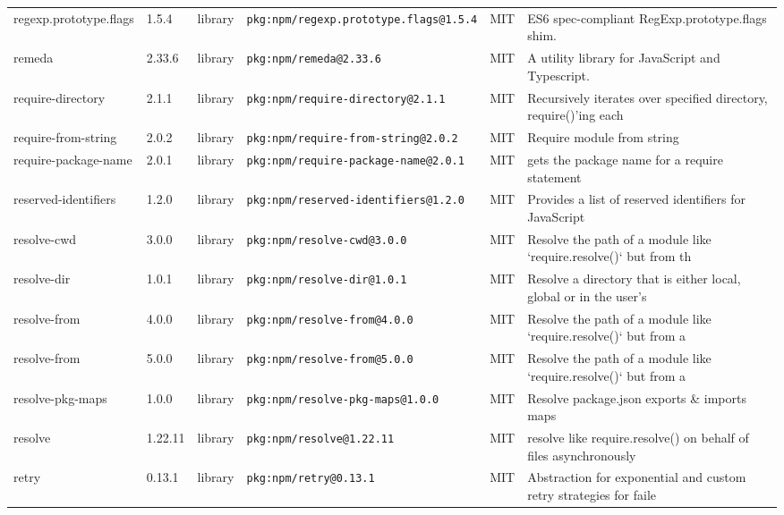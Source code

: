 \documentclass[11pt,a4paper]{article}
\begin{document}
\begin{longtable}{|p{4cm}|p{2cm}|p{1.6cm}|p{5cm}|p{1.5cm}|p{3.5cm}|}
\raggedright regexp.prototype.flags & 1.5.4 & library & \small\texttt{pkg:npm/regexp.prototype.flags@1.5.4} & MIT & \small ES6 spec-compliant RegExp.prototype.flags shim. \\
\raggedright remeda & 2.33.6 & library & \small\texttt{pkg:npm/remeda@2.33.6} & MIT & \small A utility library for JavaScript and Typescript. \\
\raggedright require-directory & 2.1.1 & library & \small\texttt{pkg:npm/require-directory@2.1.1} & MIT & \small Recursively iterates over specified directory, require()'ing each \\
\raggedright require-from-string & 2.0.2 & library & \small\texttt{pkg:npm/require-from-string@2.0.2} & MIT & \small Require module from string \\
\raggedright require-package-name & 2.0.1 & library & \small\texttt{pkg:npm/require-package-name@2.0.1} & MIT & \small gets the package name for a require statement \\
\raggedright reserved-identifiers & 1.2.0 & library & \small\texttt{pkg:npm/reserved-identifiers@1.2.0} & MIT & \small Provides a list of reserved identifiers for JavaScript \\
\raggedright resolve-cwd & 3.0.0 & library & \small\texttt{pkg:npm/resolve-cwd@3.0.0} & MIT & \small Resolve the path of a module like `require.resolve()` but from th \\
\raggedright resolve-dir & 1.0.1 & library & \small\texttt{pkg:npm/resolve-dir@1.0.1} & MIT & \small Resolve a directory that is either local, global or in the user's \\
\raggedright resolve-from & 4.0.0 & library & \small\texttt{pkg:npm/resolve-from@4.0.0} & MIT & \small Resolve the path of a module like `require.resolve()` but from a  \\
\raggedright resolve-from & 5.0.0 & library & \small\texttt{pkg:npm/resolve-from@5.0.0} & MIT & \small Resolve the path of a module like `require.resolve()` but from a  \\
\raggedright resolve-pkg-maps & 1.0.0 & library & \small\texttt{pkg:npm/resolve-pkg-maps@1.0.0} & MIT & \small Resolve package.json exports \& imports maps \\
\raggedright resolve & 1.22.11 & library & \small\texttt{pkg:npm/resolve@1.22.11} & MIT & \small resolve like require.resolve() on behalf of files asynchronously  \\
\raggedright retry & 0.13.1 & library & \small\texttt{pkg:npm/retry@0.13.1} & MIT & \small Abstraction for exponential and custom retry strategies for faile \\

\end{longtable}
\end{document}
